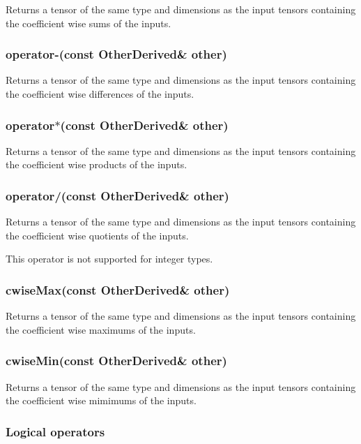 Returns a tensor of the same type and dimensions as the input tensors containing the coefficient wise sums of the inputs.

\subsubsection*{operator-\/(const Other\+Derived\& other)}

Returns a tensor of the same type and dimensions as the input tensors containing the coefficient wise differences of the inputs.

\subsubsection*{operator$\ast$(const Other\+Derived\& other)}

Returns a tensor of the same type and dimensions as the input tensors containing the coefficient wise products of the inputs.

\subsubsection*{operator/(const Other\+Derived\& other)}

Returns a tensor of the same type and dimensions as the input tensors containing the coefficient wise quotients of the inputs.

This operator is not supported for integer types.

\subsubsection*{cwise\+Max(const Other\+Derived\& other)}

Returns a tensor of the same type and dimensions as the input tensors containing the coefficient wise maximums of the inputs.

\subsubsection*{cwise\+Min(const Other\+Derived\& other)}

Returns a tensor of the same type and dimensions as the input tensors containing the coefficient wise mimimums of the inputs.

\subsubsection*{Logical operators}

